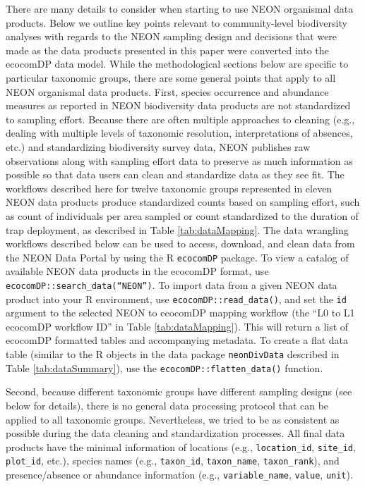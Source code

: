 \documentclass[
  12pt,
]{article}
\begin{document}
There are many details to consider when starting to use NEON organismal data products. Below we outline key points relevant to community-level biodiversity analyses with regards to the NEON sampling design and decisions that were made as the data products presented in this paper were converted into the ecocomDP data model. While the methodological sections below are specific to particular taxonomic groups, there are some general points that apply to all NEON organismal data products. First, species occurrence and abundance measures as reported in NEON biodiversity data products are not standardized to sampling effort. Because there are often multiple approaches to cleaning (e.g., dealing with multiple levels of taxonomic resolution, interpretations of absences, etc.) and standardizing biodiversity survey data, NEON publishes raw observations along with sampling effort data to preserve as much information as possible so that data users can clean and standardize data as they see fit. The workflows described here for twelve taxonomic groups represented in eleven NEON data products produce standardized counts based on sampling effort, such as count of individuals per area sampled or count standardized to the duration of trap deployment, as described in Table \ref{tab:dataMapping}. The data wrangling workflows described below can be used to access, download, and clean data from the NEON Data Portal by using the R \texttt{ecocomDP} package. To view a catalog of available NEON data products in the ecocomDP format, use \texttt{ecocomDP::search\_data(“NEON”)}. To import data from a given NEON data product into your R environment, use \texttt{ecocomDP::read\_data()}, and set the \texttt{id} argument to the selected NEON to ecocomDP mapping workflow (the ``L0 to L1 ecocomDP workflow ID'' in Table \ref{tab:dataMapping}). This will return a list of ecocomDP formatted tables and accompanying metadata. To create a flat data table (similar to the R objects in the data package \texttt{neonDivData} described in Table \ref{tab:dataSummary}), use the \texttt{ecocomDP::flatten\_data()} function.

Second, because different taxonomic groups have different sampling designs (see below for details), there is no general data processing protocol that can be applied to all taxonomic groups. Nevertheless, we tried to be as consistent as possible during the data cleaning and standardization processes. All final data products have the minimal information of locations (e.g., \texttt{location\_id}, \texttt{site\_id}, \texttt{plot\_id}, etc.), species names (e.g., \texttt{taxon\_id}, \texttt{taxon\_name}, \texttt{taxon\_rank}), and presence/absence or abundance information (e.g., \texttt{variable\_name}, \texttt{value}, \texttt{unit}).
\end{document}
